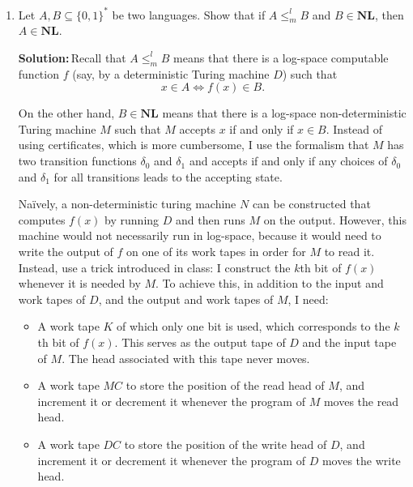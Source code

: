 \documentclass{amsart}
\theoremstyle{plain}
\theoremstyle{definition}
\newcommand{\nl}{\textbf{NL}}
\newcommand{\sol}{\textbf{Solution:\,}}
\begin{document}
\begin{enumerate}[label=\textbf{Exercise \arabic*:}, leftmargin=0cm, labelwidth=-0.2cm, align=left]
        \item
            Let $A, B \subseteq \{0, 1\}^*$ be two languages.
            Show that if $A \leq_m^l B$ and $B \in \nl$, then $A \in \nl$.

            \sol Recall that $A \leq_m^l B$ means that there is a log-space computable function $f$
            (say, by a deterministic Turing machine $D$) such that
            \begin{equation}
                x \in A \iff f(x) \in B.
                \label{eq:logspace}
            \end{equation}

            On the other hand, $B \in \nl$ means that there is a log-space non-deterministic Turing machine $M$
            such that $M$ accepts $x$ if and only if $x \in B$.
            Instead of using certificates, which is more cumbersome,
            I use the formalism that $M$ has two transition functions $\delta_0$ and $\delta_1$ and accepts if and only if
            any choices of $\delta_0$ and $\delta_1$ for all transitions leads to the accepting state.

            Naïvely, a non-deterministic turing machine $N$ can be constructed that computes $f(x)$ by running $D$ and then runs $M$ on the output.
            However, this machine would not necessarily run in log-space, because it would need to write the output of $f$ on one of its
            work tapes in order for $M$ to read it.
            Instead, use a trick introduced in class: I construct the $k$th bit of $f(x)$ whenever it is needed by $M$.
            To achieve this, in addition to the input and work tapes of $D$, and the output and work tapes of $M$, I need:
            \begin{itemize}
                \item A work tape $K$ of which only one bit is used, which corresponds to the $k$th bit of $f(x)$.
                This serves as the output tape of $D$ and the input tape of $M$.
                The head associated with this tape never moves.

                \item A work tape $MC$ to store the position of the read head of $M$, and increment it or decrement it
                whenever the program of $M$ moves the read head.

                \item A work tape $DC$ to store the position of the write head of $D$, and increment it or decrement it
                whenever the program of $D$ moves the write head.
            \end{itemize}


\end{enumerate}
\end{document}
